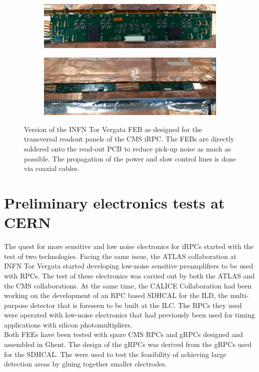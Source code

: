 	\begin{figure}[H]
		\begin{subfigure}{\linewidth}
		    \centering
			\includegraphics[width = .75\linewidth]{fig/chapt6/INFN-FEB-Transverse.png}
			\caption{\label{fig:INFN_FEB_Trans:A}}
		\end{subfigure}
		\begin{subfigure}{\linewidth}
		    \centering
			\includegraphics[width = .75\linewidth]{fig/chapt6/INFN-FEB-Transverse-on-readout.png}
			\caption{\label{fig:INFN_FEB_Trans:B}}
		\end{subfigure}
		\caption{\label{fig:INFN_FEB_Trans} Version of the INFN Tor Vergata FEB as designed for the transversal readout panels of the CMS iRPC. The FEBs are directly soldered onto the read-out PCB to reduce pick-up noise as much as possible. The propagation of the power and slow control lines is done via coaxial cables.}
    \end{figure}

\section{Preliminary electronics tests at CERN}
\label{chapt6:sec:Preliminary}

	The quest for more sensitive and low noise electronics for iRPCs started with the test of two technologies. Facing the same issue, the ATLAS collaboration at INFN Tor Vergata started developing low-noise sensitive preamplifiers to be used with RPCs. The test of these electronics was carried out by both the ATLAS and the CMS collaborations. At the same time, the CALICE Collaboration had been working on the development of an RPC based \acl{SDHCAL} for the ILD, the multi-purpose detector that is foreseen to be built at the \acf{ILC}. The RPCs they used were operated with low-noise electronics that had previously been used for timing applications with silicon photomultipliers.\\
	Both FEEs have been tested with spare CMS RPCs and \acl{gRPCs} designed and assembled in Ghent. The design of the gRPCs was derived from the gRPCs used for the SDHCAL. The were used to test the feasibility of achieving large detection areas by gluing together smaller electrodes.

